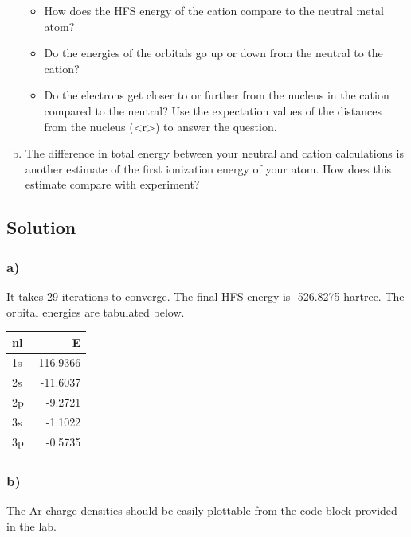 \documentclass[11pt]{article}
\begin{document}
\begin{enumerate}[(a)]
\begin{itemize}
\item How does the HFS energy of the cation compare to the neutral metal atom?
\item Do the energies of the orbitals go up or down from the neutral to the cation?
\item Do the electrons get closer to or further from the nucleus in the cation compared to the neutral? Use the expectation values of the distances from the nucleus (<r>) to answer the question.
\end{itemize}

\item The difference in total energy between your neutral and cation calculations is another estimate of the first ionization energy of your atom. How does this estimate compare with experiment?
\end{enumerate}



\subsection{Solution}
\label{sec-2-1}

\subsubsection{a)}
\label{sec-2-1-1}

It takes 29 iterations to converge. The final HFS energy is -526.8275 hartree. The orbital energies are tabulated below.

\begin{center}
\begin{tabular}{lr}
nl & E\\
\hline
1s & -116.9366\\
2s & -11.6037\\
2p & -9.2721\\
3s & -1.1022\\
3p & -0.5735\\
\end{tabular}
\end{center}

\subsubsection{b)}
\label{sec-2-1-2}

The Ar charge densities should be easily plottable from the code block provided in the lab.
\end{document}
